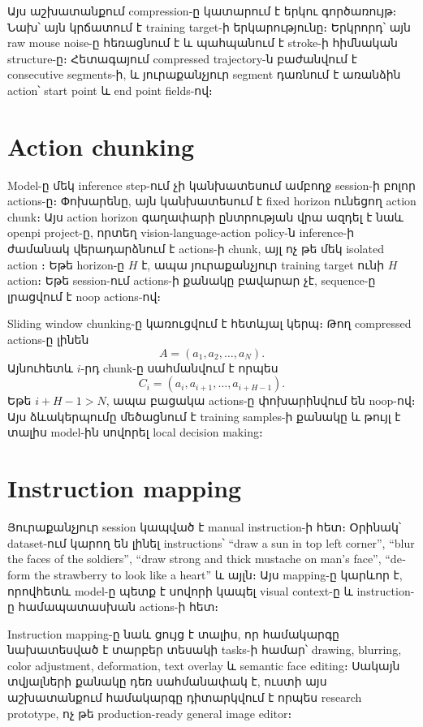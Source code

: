 \documentclass[12pt,a4paper]{report}
\newcommand{\Eng}[1]{\textenglish{#1}}
\begin{document}
Այս աշխատանքում compression-ը կատարում է երկու գործառույթ։ Նախ՝ այն կրճատում է training target-ի երկարությունը։ Երկրորդ՝ այն raw mouse noise-ը հեռացնում է և պահպանում է stroke-ի հիմնական structure-ը։ Հետագայում compressed trajectory-ն բաժանվում է consecutive segments-ի, և յուրաքանչյուր segment դառնում է առանձին action՝ start point և end point fields-ով։

\section{Action chunking}

Model-ը մեկ inference step-ում չի կանխատեսում ամբողջ session-ի բոլոր actions-ը։ Փոխարենը, այն կանխատեսում է fixed horizon ունեցող action chunk։ Այս action horizon գաղափարի ընտրության վրա ազդել է նաև \Eng{openpi} project-ը, որտեղ \Eng{vision-language-action} policy-ն inference-ի ժամանակ վերադարձնում է actions-ի chunk, այլ ոչ թե մեկ isolated action \cite{OpenPI}։ Եթե horizon-ը $H$ է, ապա յուրաքանչյուր training target ունի $H$ action։ Եթե session-ում actions-ի քանակը բավարար չէ, sequence-ը լրացվում է noop actions-ով։

Sliding window chunking-ը կառուցվում է հետևյալ կերպ։ Թող compressed actions-ը լինեն
\begin{equation}
    A = (a_1,a_2,\ldots,a_N).
\end{equation}
Այնուհետև $i$-րդ chunk-ը սահմանվում է որպես
\begin{equation}
    C_i = (a_i,a_{i+1},\ldots,a_{i+H-1}).
\end{equation}
Եթե $i+H-1>N$, ապա բացակա actions-ը փոխարինվում են noop-ով։ Այս ձևակերպումը մեծացնում է training samples-ի քանակը և թույլ է տալիս model-ին սովորել local decision making։

\section{Instruction mapping}

Յուրաքանչյուր session կապված է manual instruction-ի հետ։ Օրինակ՝ dataset-ում կարող են լինել instructions՝ \Eng{``draw a sun in top left corner''}, \Eng{``blur the faces of the soldiers''}, \Eng{``draw strong and thick mustache on man's face''}, \Eng{``deform the strawberry to look like a heart''} և այլն։ Այս mapping-ը կարևոր է, որովհետև model-ը պետք է սովորի կապել visual context-ը և instruction-ը համապատասխան actions-ի հետ։

Instruction mapping-ը նաև ցույց է տալիս, որ համակարգը նախատեսված է տարբեր տեսակի tasks-ի համար՝ drawing, blurring, color adjustment, deformation, text overlay և semantic face editing։ Սակայն տվյալների քանակը դեռ սահմանափակ է, ուստի այս աշխատանքում համակարգը դիտարկվում է որպես research prototype, ոչ թե production-ready general image editor։
\end{document}
